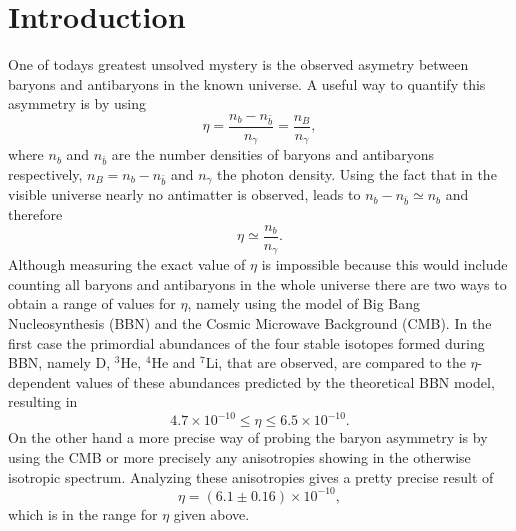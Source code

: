\chapter{Introduction}
One of todays greatest unsolved mystery is the observed asymetry between baryons and antibaryons in the known universe. A useful way to quantify this asymmetry is by using
\begin{equation}
	\eta=\frac{n_b-n_{\bar{b}}}{n_\gamma}=\frac{n_B}{n_\gamma},
	\label{eq:asymmetry}
\end{equation}
where $n_b$ and $n_{\bar{b}}$ are the number densities of baryons and antibaryons respectively, $n_B=n_b-n_{\bar{b}}$ and $n_\gamma$ the photon density. Using the fact that in the visible universe nearly no antimatter is observed, leads to $n_b-n_{\bar{b}}\simeq n_b$ and therefore
\begin{equation}
\eta\simeq\frac{n_b}{n_\gamma}.
\end{equation}\newline \indent
Although measuring the exact value of $\eta$ is impossible because this would include counting all baryons and antibaryons in the whole universe there are two ways to obtain a range of values for $\eta$, namely using the model of Big Bang Nucleosynthesis (BBN) and the Cosmic Microwave Background (CMB)\cite{Sarkar:2002er}. In the first case the primordial abundances of the four stable isotopes formed during BBN, namely D, $^3$He, $^4$He and $^7$Li, that are observed, are compared to the $\eta$-dependent values of these abundances predicted by the theoretical BBN model, resulting in 
\cite[Eq. (1.25)]{Biondini:2016hhn}
\begin{equation}
	4.7\times10^{-10}\leq\eta\leq6.5\times10^{-10}.
\end{equation}
On the other hand a more precise way of probing the baryon asymmetry is by using the CMB or more precisely any anisotropies showing in the otherwise isotropic spectrum. Analyzing these anisotropies gives a pretty precise result of \cite[Eq. (1.26)]{Biondini:2016hhn}
\begin{equation}
\eta=(6.1\pm0.16)\times10^{-10},
\label{eq:eta_value}
\end{equation}
which is in the range for $\eta$ given above.\newline \indent
